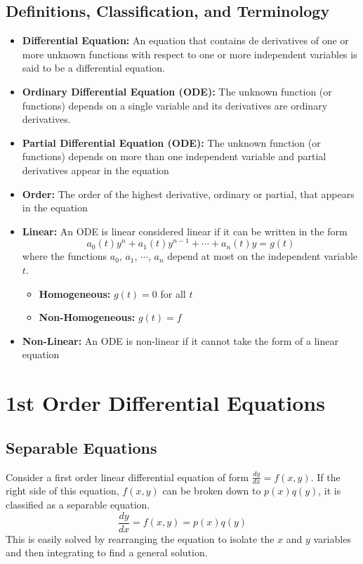 \documentclass[11pt]{article}
\begin{document}
\subsection{Definitions, Classification, and Terminology}
\begin{itemize}
\item \textbf{Differential Equation:} An equation that contains de derivatives of one or more unknown functions with respect to one or more independent variables is said to be a differential  equation.
\item \textbf{Ordinary Differential Equation (ODE):} The unknown function (or functions) depends on a single variable and its derivatives are ordinary derivatives.
\item \textbf{Partial Differential Equation (ODE):} The unknown function (or functions) depends on more than one independent variable and partial derivatives appear in the equation
\item \textbf{Order:} The order of the highest derivative, ordinary or partial, that appears in the equation
\item \textbf{Linear:} An ODE is linear considered linear if it can be written in the form $$a_0(t)y^n + a_1(t)y^{n-1} + \cdots + a_n(t)y = g(t)$$ where the functions $a_0$, $a_1$, $\cdots$, $a_n$ depend at most on the independent variable $t$.
\begin{itemize}
\item \textbf{Homogeneous:} $g(t) = 0$ for all $t$
\item \textbf{Non-Homogeneous:} $g(t) = f$
\end{itemize}
\item \textbf{Non-Linear:} An ODE is non-linear if it cannot take the form of a linear equation
\end{itemize}

\pagebreak
\section{1st Order Differential Equations}
\subsection{Separable Equations}
Consider a first order linear differential equation of form $\frac{dy}{dx} = f(x,y)$. If the right side of this equation, $f(x,y)$ can be broken down to $p(x)q(y)$, it is classified as a separable equation.
$$\frac{dy}{dx} = f(x,y) = p(x)q(y)$$
This is easily solved by rearranging the equation to isolate the $x$ and $y$ variables and then integrating to find a general solution.
\end{document}
